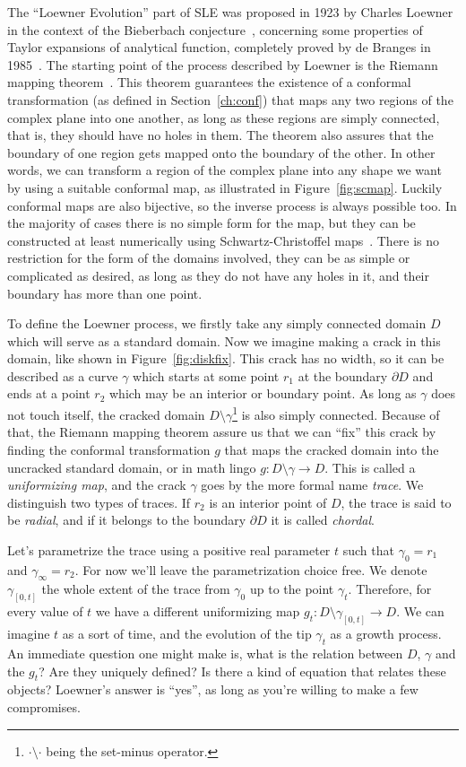 The ``Loewner Evolution'' part of SLE was proposed in 1923 by Charles Loewner
in the context of the Bieberbach conjecture~\cite{Loewner1923}, concerning some
properties of Taylor expansions of analytical function, completely proved by de
Branges in 1985~\cite{DeBranges1985}. The starting point of the process
described by Loewner is the Riemann mapping theorem~\cite{Ahlfors1979}. This
theorem guarantees the existence of a conformal transformation (as defined in
Section~\ref{ch:conf}) that maps any two regions of the complex plane into one
another, as long as these regions are simply connected, that is, they should
have no holes in them. The theorem also assures that the boundary of one region
gets mapped onto the boundary of the other. In other words, we can transform a
region of the complex plane into any shape we want by using a suitable
conformal map, as illustrated in Figure~\ref{fig:scmap}. Luckily conformal maps
are also bijective, so the inverse process is always possible too. In the
majority of cases there is no simple form for the map, but they can be
constructed at least numerically using Schwartz-Christoffel
maps~\cite{Driscoll2002}. There is no restriction for the form of the domains
involved, they can be as simple or complicated as desired, as long as they do
not have any holes in it, and their boundary has more than one point.

To define the Loewner process, we firstly take any simply connected domain $D$
which will serve as a standard domain. Now we imagine making a crack in this
domain, like shown in Figure~\ref{fig:diskfix}. This crack has no width, so it
can be described as a curve $\gamma$ which starts at some point $r_1$ at the
boundary $\partial D$ and ends at a point $r_2$ which may be an interior or
boundary point. As long as $\gamma$ does not touch itself, the cracked domain
$D\setminus\gamma$\footnote{$\cdot\setminus\cdot$ being the set-minus
    operator.} is also simply connected. Because of that, the Riemann mapping
theorem assure us that we can ``fix'' this crack by finding the conformal
transformation $g$ that maps the cracked domain into the uncracked standard
domain, or in math lingo $g:D\setminus\gamma\rightarrow D$. This is called a
\textit{uniformizing map}, and the crack  $\gamma$ goes by the more formal name
\textit{trace}. We distinguish two types of traces. If $r_2$ is an interior
point of $D$, the trace is said to be \textit{radial}, and if it belongs to the
boundary $\partial D$ it is called \textit{chordal}.

Let's parametrize the trace using a positive real parameter $t$ such that
$\gamma_{0}=r_1$ and $\gamma_{\infty}=r_2$. For now we'll leave the
parametrization choice free. We denote $\gamma_{[0,t]}$ the whole extent of the
trace from $\gamma_0$ up to the point $\gamma_t$. Therefore, for every value of
$t$ we have a different uniformizing map
$g_t:D\setminus\gamma_{[0,t]}\rightarrow D$. We can imagine $t$ as a sort of
time, and the evolution of the tip $\gamma_t$ as a growth process.
An immediate question one might make is, what is the relation between $D$,
$\gamma$ and the $g_t$? Are they uniquely defined? Is there a kind of equation
that relates these objects? Loewner's answer is ``yes'', as long as you're
willing to make a few compromises.

